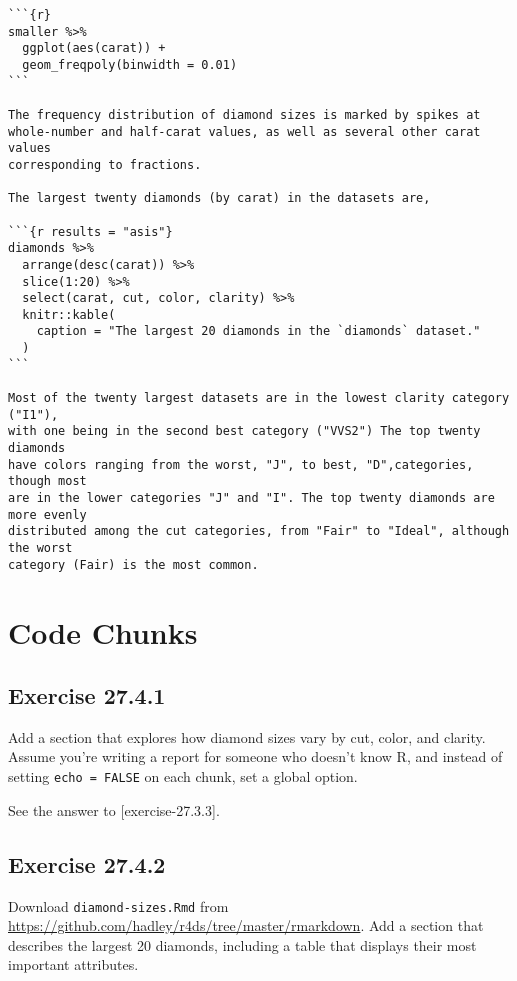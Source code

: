 \documentclass[]{book}
\theoremstyle{plain}
\theoremstyle{remark}
\begin{document}
\begin{verbatim}
```{r}
smaller %>%
  ggplot(aes(carat)) +
  geom_freqpoly(binwidth = 0.01)
```

The frequency distribution of diamond sizes is marked by spikes at
whole-number and half-carat values, as well as several other carat values
corresponding to fractions.

The largest twenty diamonds (by carat) in the datasets are,

```{r results = "asis"}
diamonds %>%
  arrange(desc(carat)) %>%
  slice(1:20) %>%
  select(carat, cut, color, clarity) %>%
  knitr::kable(
    caption = "The largest 20 diamonds in the `diamonds` dataset."
  )
```

Most of the twenty largest datasets are in the lowest clarity category ("I1"),
with one being in the second best category ("VVS2") The top twenty diamonds 
have colors ranging from the worst, "J", to best, "D",categories, though most
are in the lower categories "J" and "I". The top twenty diamonds are more evenly
distributed among the cut categories, from "Fair" to "Ideal", although the worst
category (Fair) is the most common.
\end{verbatim}

\hypertarget{code-chunks}{%
\section{Code Chunks}\label{code-chunks}}

\hypertarget{exercise-27.4.1}{%
\subsection*{\texorpdfstring{Exercise
{27.4.1}}{Exercise 27.4.1}}\label{exercise-27.4.1}}

Add a section that explores how diamond sizes vary by cut, color, and
clarity. Assume you're writing a report for someone who doesn't know R,
and instead of setting \texttt{echo\ =\ FALSE} on each chunk, set a
global option.

See the answer to {[}exercise-27.3.3{]}.

\hypertarget{exercise-27.4.2}{%
\subsection*{\texorpdfstring{Exercise
{27.4.2}}{Exercise 27.4.2}}\label{exercise-27.4.2}}

Download \texttt{diamond-sizes.Rmd} from
\url{https://github.com/hadley/r4ds/tree/master/rmarkdown}. Add a
section that describes the largest 20 diamonds, including a table that
displays their most important attributes.
\end{document}

